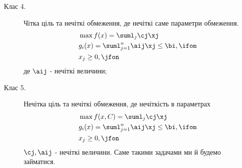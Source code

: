\begin{description}
\item[Клас 4.] Чітка ціль та нечіткі обмеження, де нечіткі саме параметри обмеження. 
\begin{eqnarray}
&\max f(x) = \suml_{j}\cj\xj\\
&g_i(x) = \suml_{j=1}^n \aij\xj\leq \bi,\ifom\\
&x_j\geq 0,\jfon
\end{eqnarray}
де $\aij$ - нечіткі величини;
\item[Клас 5.] Нечітка ціль та нечіткі обмеження, де нечіткість в параметрах
\begin{eqnarray}
&\max f(x,C) = \suml_{j}\cj\xj\\
&g_i(x) = \suml_{j=1}^n \aij\xj\leq \bi,\ifom\\
&x_j\geq 0,\jfon
\end{eqnarray}
$\cj,\aij$ - нечіткі величини. Саме такими задачами ми й будемо займатися.
\end{description}